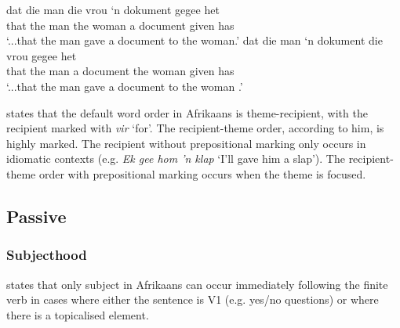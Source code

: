 \begin{exe}
\ex
\begin{xlist}
\ex \gll dat die man die vrou `n dokument gegee het\\
that the man the woman a document given has\\
\trans `...that the man gave a document to the woman.'
\ex \gll dat die man `n dokument die vrou gegee het\\
that the man a document the woman given has\\
\trans `...that the man gave a document to the woman \citep{Louw.2012}.'
\end{xlist}
\end{exe}
\cite{Donaldson.1993} states that the default word order in Afrikaans is theme-recipient, with the recipient marked with \emph{vir} `for'. The recipient-theme order, according to him, is highly marked. The recipient without prepositional marking only occurs in idiomatic contexts (e.g. \emph{Ek gee hom 'n klap} `I'll gave him a slap'). The recipient-theme order with prepositional marking occurs when the theme is focused.
\subsection{Passive}
\subsubsection{Subjecthood}
\cite{Stadler.1996} states that only subject in Afrikaans can occur immediately following the finite verb in cases where either the sentence is V1 (e.g. yes/no questions) or where there is a topicalised element.
